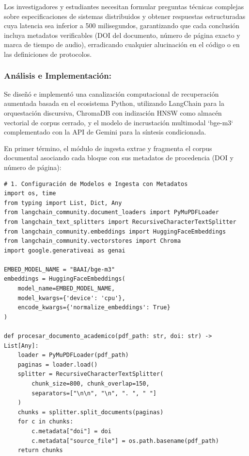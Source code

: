Los investigadores y estudiantes necesitan formular preguntas técnicas complejas sobre especificaciones de sistemas distribuidos y obtener respuestas estructuradas cuya latencia sea inferior a 500 milisegundos, garantizando que cada conclusión incluya metadatos verificables (DOI del documento, número de página exacto y marca de tiempo de audio), erradicando cualquier alucinación en el código o en las definiciones de protocolos.

\subsubsection*{Análisis e Implementación:}
Se diseñó e implementó una canalización computacional de recuperación aumentada basada en el ecosistema Python, utilizando LangChain para la orquestación discursiva, ChromaDB con indización HNSW como almacén vectorial de corpus cerrado, y el modelo de incrustación multimodal `bge-m3` complementado con la API de Gemini para la síntesis condicionada.

En primer término, el módulo de ingesta extrae y fragmenta el corpus documental asociando cada bloque con sus metadatos de procedencia (DOI y número de página):

\begin{tcolorbox}[colback=bg_marfil, colframe=unmsm_gold, arc=3pt, boxrule=0.6pt, top=0.2cm, bottom=0.2cm, left=0.4cm, right=0.4cm]
\footnotesize
\begin{verbatim}
# 1. Configuración de Modelos e Ingesta con Metadatos
import os, time
from typing import List, Dict, Any
from langchain_community.document_loaders import PyMuPDFLoader
from langchain_text_splitters import RecursiveCharacterTextSplitter
from langchain_community.embeddings import HuggingFaceEmbeddings
from langchain_community.vectorstores import Chroma
import google.generativeai as genai

EMBED_MODEL_NAME = "BAAI/bge-m3"
embeddings = HuggingFaceEmbeddings(
    model_name=EMBED_MODEL_NAME,
    model_kwargs={'device': 'cpu'},
    encode_kwargs={'normalize_embeddings': True}
)

def procesar_documento_academico(pdf_path: str, doi: str) -> List[Any]:
    loader = PyMuPDFLoader(pdf_path)
    paginas = loader.load()
    splitter = RecursiveCharacterTextSplitter(
        chunk_size=800, chunk_overlap=150,
        separators=["\n\n", "\n", ". ", " "]
    )
    chunks = splitter.split_documents(paginas)
    for c in chunks:
        c.metadata["doi"] = doi
        c.metadata["source_file"] = os.path.basename(pdf_path)
    return chunks
\end{verbatim}
\end{tcolorbox}

